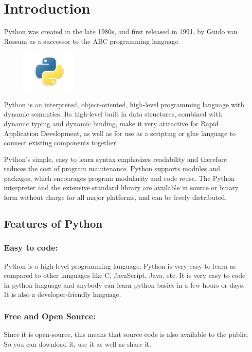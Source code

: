 \documentclass[12pt, a4paper]{report}
\begin{document}
  \section{Introduction}
  Python was created in the late 1980s, and first released in 1991, by Guido van Rossum as a successor to the ABC programming language.
  \begin{figure}
    \includegraphics[width=0.25\textwidth]{introduction}
  \end{figure}
  Python is an interpreted, object-oriented, high-level programming language with dynamic semantics. Its high-level built in data structures, combined with dynamic typing and dynamic binding, make it very attractive for Rapid Application Development, as well as for use as a scripting or glue language to connect existing components together.

  Python's simple, easy to learn syntax emphasizes readability and therefore reduces the cost of program maintenance. Python supports modules and packages, which encourages program modularity and code reuse. The Python interpreter and the extensive standard library are available in source or binary form without charge for all major platforms, and can be freely distributed.
  
  \subsection{Features of Python}
    \subsubsection{Easy to code:}
    Python is a high-level programming language. Python is very easy to learn as compared to other languages like C, JavaScript, Java, etc. It is very easy to code in python language and anybody can learn python basics in a few hours or days. It is also a developer-friendly language.
    
    \subsubsection{Free and Open Source:}
    Since it is open-source, this means that source code is also available to the public. So you can download it, use it as well as share it.
    
\end{document}
